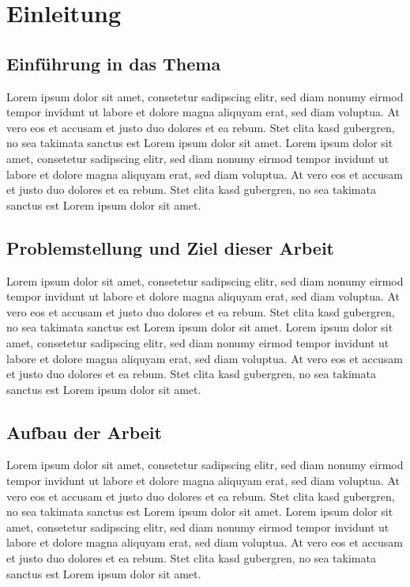 \documentclass[a4paper,12pt]{article}
\begin{document}
\clearpage


\pagestyle{fancy}
\fancyhead{}
\fancyhead[RO,LE]{\thepage}
\fancyfoot[CO,CE]{}

\nocite{*} 




\section{Einleitung}
\subsection{Einführung in das Thema}
Lorem ipsum dolor sit amet, consetetur sadipscing elitr, sed diam nonumy eirmod tempor invidunt ut labore et dolore magna aliquyam erat, sed diam voluptua. At vero eos et accusam et justo duo dolores et ea rebum. Stet clita kasd gubergren, no sea takimata sanctus est Lorem ipsum dolor sit amet. Lorem ipsum dolor sit amet, consetetur sadipscing elitr, sed diam nonumy eirmod tempor invidunt ut labore et dolore magna aliquyam erat, sed diam voluptua. At vero eos et accusam et justo duo dolores et ea rebum. Stet clita kasd gubergren, no sea takimata sanctus est Lorem ipsum dolor sit amet.

\subsection{Problemstellung und Ziel dieser Arbeit}

Lorem ipsum dolor sit amet, consetetur sadipscing elitr, sed diam nonumy eirmod tempor invidunt ut labore et dolore magna aliquyam erat, sed diam voluptua. At vero eos et accusam et justo duo dolores et ea rebum. Stet clita kasd gubergren, no sea takimata sanctus est Lorem ipsum dolor sit amet. Lorem ipsum dolor sit amet, consetetur sadipscing elitr, sed diam nonumy eirmod tempor invidunt ut labore et dolore magna aliquyam erat, sed diam voluptua. At vero eos et accusam et justo duo dolores et ea rebum. Stet clita kasd gubergren, no sea takimata sanctus est Lorem ipsum dolor sit amet.

\subsection{Aufbau der Arbeit}

Lorem ipsum dolor sit amet, consetetur sadipscing elitr, sed diam nonumy eirmod tempor invidunt ut labore et dolore magna aliquyam erat, sed diam voluptua. At vero eos et accusam et justo duo dolores et ea rebum. Stet clita kasd gubergren, no sea takimata sanctus est Lorem ipsum dolor sit amet. Lorem ipsum dolor sit amet, consetetur sadipscing elitr, sed diam nonumy eirmod tempor invidunt ut labore et dolore magna aliquyam erat, sed diam voluptua. At vero eos et accusam et justo duo dolores et ea rebum. Stet clita kasd gubergren, no sea takimata sanctus est Lorem ipsum dolor sit amet.
\end{document}
